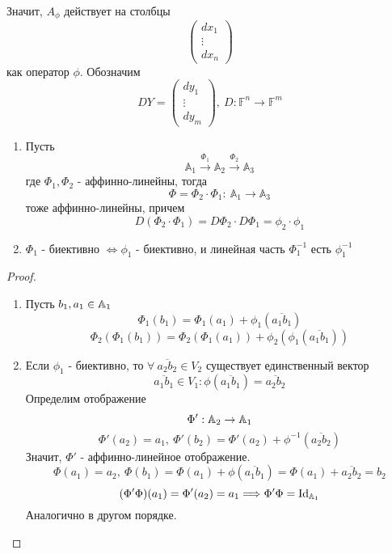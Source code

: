 Значит, $A_{\phi}$ действует на столбцы
\[\begin{pmatrix}
    dx_1\\
    \vdots\\
    dx_n
\end{pmatrix}
\]
как оператор $\phi$.
Обозначим
\[DY=\begin{pmatrix}
    dy_1\\
    \vdots\\
    dy_m
\end{pmatrix},\
D: \mathbb{F}^n \to \mathbb{F}^m
\]
\begin{subtheorem} \tab
    \begin{enumerate}
        \item Пусть 
        \[\mathbb{A}_1 \xrightarrow{\Phi_1} \mathbb{A}_2 \xrightarrow{\Phi_2} \mathbb{A}_3\]
        где $\Phi_1,\Phi_2$ - аффинно-линейны, тогда
        \[\Phi=\Phi_2\cdot \Phi_1: \ \mathbb{A}_1\to \mathbb{A}_3\]
        тоже аффинно-линейны, причем 
        \[D(\Phi_2\cdot \Phi_1)=D\Phi_2\cdot D\Phi_1=\phi_2\cdot\phi_1\]
        \item $\Phi_1$ - биективно $\Longleftrightarrow \phi_1$ - биективно, и линейная часть $\Phi_1^{-1}$ есть $\phi_1^{-1}$
    \end{enumerate}
\end{subtheorem}
\begin{proof}
    \begin{enumerate}
        \item Пусть $b_1, a_1\in \mathbb{A}_1$
        \[\Phi_1(b_1)=\Phi_1(a_1)+\phi_1(\overline{a_1b_1})\]
        \[\Phi_2(\Phi_1(b_1))=\Phi_2(\Phi_1(a_1))+\phi_2(\phi_1(\overline{a_1b_1}))\]
        \item Если $\phi_1$ - биективно, то $\forall\ \overline{a_2b_2}\in V_2$ существует единственный вектор
        \[\overline{a_1b_1}\in V_1: \phi(\overline{a_1b_1})=\overline{a_2b_2}\]
        Определим отображение 
        \[\Phi': \mathbb{A}_2\to \mathbb{A}_1\]
        \[\Phi'(a_2)=a_1,\ \Phi'(b_2)=\Phi'(a_2)+\phi^{-1}(\overline{a_2b_2})\]
        Значит, $\Phi'$ - аффинно-линейное отображение.
        \[\Phi(a_1)=a_2,\ \Phi(b_1)=\Phi(a_1)+\phi(\overline{a_1b_1})=\Phi(a_1)+\overline{a_2b_2}=b_2\]
        \[(\Phi'\Phi)(a_1)=\Phi'(a_2)=a_1 \Longrightarrow \Phi'\Phi = \text{Id}_{\mathbb{A}_1}\] 
        Аналогично в другом порядке.
    \end{enumerate}
\end{proof} 
